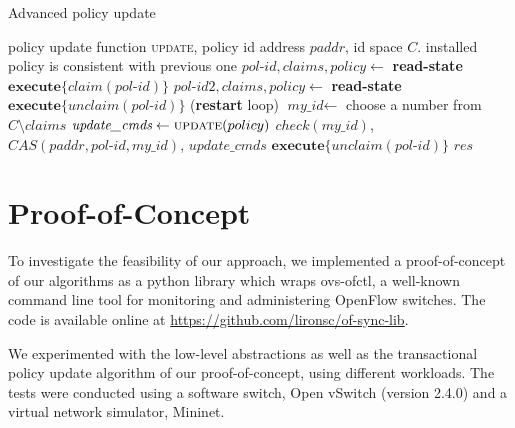 \documentclass{sig-alternate-2006}
\newcommand{\claimcheck}{check\xspace}
\newcommand{\paddr}{\textit{paddr}\xspace}
\newcommand{\pid}{\textit{pol-id}\xspace}
\newcommand{\ufunc}{update} %
\newcommand{\liron}[1]{\textit{\textcolor{mypurple}{[liron]: #1}}} %
\newcommand{\petr}[1]{\textit{\textcolor{blue}{[petr]: #1}}} %
\newcommand{\ack}{\textit{ack}}
\begin{document}



{\scriptsize
\begin{algorithm}[t]
    \caption{Advanced policy update}
    \label{alg:update}
    \begin{algorithmic}[1]
        \Require policy update function \textsc{\ufunc}, policy id address $\paddr$, id space $C$.
    \Ensure installed policy is consistent with previous one
 		\Repeat
		 	\State $\pid,claims,policy\gets$ \textbf{read-state} \label{update:read-state1} %
 			\State $\textbf{execute}\{claim(\pid)\}$
 			\State $\pid 2,\textit{claims},\textit{policy}\gets$ \textbf{read-state} \label{update:read-state2} %
 			\If {$\pid\neq \pid 2$}
	 			\State $\textbf{execute} \{\textit{unclaim}(\pid)\}$
 				 (\textbf{restart} loop)
 			\EndIf
 			\State $\textit{my\_id}\gets$ choose a number from $C\setminus claims$
 			\State $\textit{update\_cmds}\gets \textsc{\ufunc}(policy)$ \label{update:compute}
 			\startTxn
 				\State $\claimcheck(my\_id)$,
	 			\State $CAS(\paddr, \pid,my\_id)$,
	 			\State $\textit{update\_cmds}$ %
 			\endTxn
	 		\State $\textbf{execute} \{\textit{unclaim}(\pid)\}$
     	\Until{$res=\ack$}
			\Return $\textit{res}$

    \end{algorithmic}
\end{algorithm}
}


\section{Proof-of-Concept}

To investigate the feasibility of our approach,
we implemented a proof-of-concept of our algorithms
as a python library which wraps ovs-ofctl, 
a well-known command line tool for monitoring and administering OpenFlow switches. 
The code is available online at
\url{https://github.com/lironsc/of-sync-lib}. 

We experimented with the low-level abstractions as well as the 
transactional policy update algorithm of our proof-of-concept, using
different workloads. 
The tests were conducted using a software switch, Open vSwitch (version 2.4.0) and
a virtual network simulator, Mininet.
\end{document}
